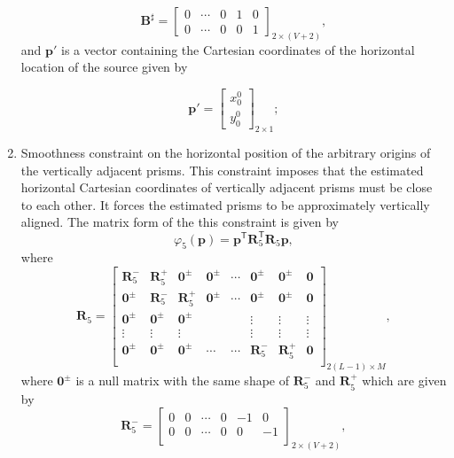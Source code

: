 \begin{enumerate}
\begin{equation}
\textbf{B}^{\sharp} = 
\begin{bmatrix}
0 & \cdots & 0 & 1 & 0 \\
0 & \cdots & 0 & 0 & 1
\end{bmatrix}_{2\times (V+2)},
\end{equation}
and $\textbf{p}'$ is a vector containing the Cartesian coordinates of the horizontal location of the source given by

\begin{equation}
\textbf{p}' = 
\begin{bmatrix}
x^0_0 \\
y^0_0
\end{bmatrix}_{2\times 1} ;
\end{equation}

\item Smoothness constraint on the horizontal position of the arbitrary origins of the vertically adjacent prisms. This constraint imposes that the estimated horizontal Cartesian coordinates of vertically adjacent prisms must be close to each other. It forces the estimated prisms to be approximately vertically aligned. The matrix form of the this constraint is given by
\begin{equation}
\varphi_{5}(\textbf{p}) = \textbf{p}^\mathsf{T}\textbf{R}^\mathsf{T}_{5}\textbf{R}_{5}\textbf{p} ,
\end{equation}
where
\begin{equation}
\mathbf{R}_{5} = 
\begin{bmatrix}
\mathbf{R}^{-}_{5} & \mathbf{R}^{+}_{5} & \mathbf{0}^{\pm} & \mathbf{0}^{\pm} & \cdots & \mathbf{0}^{\pm} & \mathbf{0}^{\pm} & \mathbf{0}\\
\mathbf{0}^{\pm} & \mathbf{R}^{-}_{5} & \mathbf{R}^{+}_{5} & \mathbf{0}^{\pm} & \cdots & \mathbf{0}^{\pm} & \mathbf{0}^{\pm} & \mathbf{0}\\
\mathbf{0}^{\pm} & \mathbf{0}^{\pm} & \mathbf{0}^{\pm} &  &  & \vdots & \vdots & \vdots\\
\vdots & \vdots & \vdots &  &  & \vdots & \vdots & \vdots\\
\mathbf{0}^{\pm} & \mathbf{0}^{\pm} & \mathbf{0}^{\pm} & \cdots & \cdots & \mathbf{R}^{-}_{5} & \mathbf{R}^{+}_{5} & \mathbf{0}\\
\end{bmatrix}_{2(L-1)\times M},
\end{equation}
where $\mathbf{0}^{\pm}$ is a null matrix with the same shape of $\mathbf{R}^{-}_{5}$ and $\mathbf{R}^{+}_{5}$ which are given by
\begin{equation}
\textbf{R}^{-}_{5} = 
\begin{bmatrix}
0 & 0 & \cdots & 0 & -1 & 0 \\
0 & 0 & \cdots & 0 & 0 & -1 \\
\end{bmatrix}_{2\times (V+2)},
\end{equation}


\end{enumerate}
